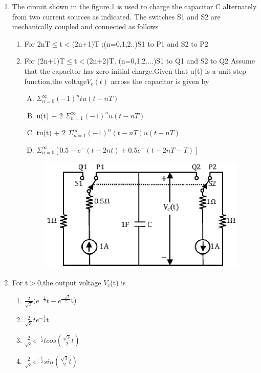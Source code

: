 \documentclass[journal,12pt,twocolumn]{IEEEtran}
\begin{document}
\begin{enumerate}
\item The circuit shown in the figure.\ref{fig72} is used to charge the capacitor C alternately from two current sources as indicated. The switches S1 and S2 are mechanically coupled and connected as follows
\begin{enumerate}
\setlength\itemsep{2em}
\item For 2nT$\leq$t$<$(2n+1)T ;(n=0,1,2..)S1 to P1 and S2 to P2
 \item For (2n+1)T$\leq$t$<$(2n+2)T, (n=0,1,2....)S1 to Q1 and S2 to Q2
 Assume that the capacitor has zero initial charge.Given that u(t) is a unit step function,the voltage$ V_{c}(t) $ across the capacitor is given by
 \begin{enumerate}[(A)]
 \item $ \Sigma_{n=0}^{\infty} (-1)^{n} tu(t-nT)$
 \item u(t) + 2 $ \Sigma_{n=1}^{\infty} (-1)^{n} u(t-nT)$
 \item tu(t) + 2 $ \Sigma_{n=1}^{\infty} (-1)^{n} (t-nT) u(t-nT)$
 \item $\Sigma_{n=0}^{\infty}[0.5 - e^-({t-2nt})+0.5e^-({t-2nT-T})]$
 
\end{enumerate}
\begin{figure}[!h]
\begin{center}
\includegraphics[scale=0.7]{./figs/fig72.eps}
\caption{}
\label{fig72}
\end{center}
\end{figure}
\end{enumerate}

\item For t$>$0,the output voltage $V_{c}$(t) is
\begin{enumerate}
\setlength\itemsep{2em}
\item $\frac{2}{\sqrt{3}}(e^{-\frac{1}{2}}t-e^{\frac{-\sqrt{3}}{2}}$t)
\item $\frac{2}{\sqrt{3}}te^{-\frac{1}{2}}$t
\item $ \frac{2}{\sqrt{3}}e^{-\frac{1}{2}}t cos(\frac{\sqrt{3}}{2}t)$
\item $ \frac{2}{\sqrt{3}}e^{-\frac{t}{2}} sin(\frac{\sqrt{3}}{2}t)$
\end{enumerate}


\end{enumerate}
\end{document}
